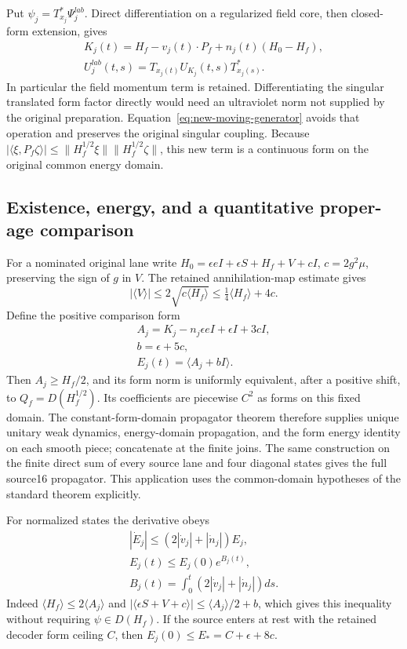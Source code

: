 Put \(\psi_j=T_{x_j}^*\Psi_j^{lab}\). Direct differentiation on a
regularized field core, then closed-form extension, gives
\begin{equation}
\begin{gathered}
K_j(t)=H_f-v_j(t)\cdot P_f+n_j(t)(H_0-H_f),\\
 U_j^{lab}(t,s)=T_{x_j(t)}U_{K_j}(t,s)T_{x_j(s)}^* .
\end{gathered}
\label{eq:new-moving-generator}
\end{equation}
In particular the field momentum term is retained. Differentiating the
singular translated form factor directly would need an ultraviolet norm
not supplied by the original preparation. Equation~\eqref{eq:new-moving-generator}
avoids that operation and preserves the original singular coupling.
Because \(|\langle\xi,P_f\zeta\rangle|\leq
\|H_f^{1/2}\xi\|\|H_f^{1/2}\zeta\|\), this new term is a continuous
form on the original common energy domain.

\subsection{Existence, energy, and a quantitative proper-age comparison}
For a nominated original lane write
\(H_0=\epsilon eI+\epsilon S+H_f+V+cI\),
\(c=2g^2\mu\), preserving the sign of \(g\) in \(V\).
The retained annihilation-map estimate gives
\[
 |\langle V\rangle|\leq2\sqrt{c\langle H_f\rangle}
 \leq\tfrac14\langle H_f\rangle+4c.
\]
Define the positive comparison form
\[\begin{gathered}
A_j=K_j-n_j\epsilon eI+\epsilon I+3cI,
 \\
 b=\epsilon+5c,\\
 E_j(t)=\langle A_j+bI\rangle.
\end{gathered}\]
Then \(A_j\geq H_f/2\), and its form norm is uniformly equivalent,
after a positive shift, to \(Q_f=D(H_f^{1/2})\). Its coefficients are
piecewise \(C^2\) as forms on this fixed domain. The constant-form-domain
propagator theorem therefore supplies unique unitary weak dynamics,
energy-domain propagation, and the form energy identity on each smooth
piece; concatenate at the finite joins. The same construction on the
finite direct sum of every source lane and four diagonal states gives the
full source16 propagator. This application uses the common-domain
hypotheses of the standard theorem explicitly.\cite{ConstantForm}

For normalized states the derivative obeys
\[\begin{gathered}
|\dot E_j|\leq(2|\dot v_j|+|\dot n_j|)E_j,
 \\
 E_j(t)\leq E_j(0)e^{B_j(t)},\\
 B_j(t)=\int_0^t(2|\dot v_j|+|\dot n_j|)ds.
\end{gathered}\]
Indeed \(\langle H_f\rangle\leq2\langle A_j\rangle\) and
\(|\langle\epsilon S+V+c\rangle|\leq
\langle A_j\rangle/2+b\), which gives this inequality without
requiring \(\psi\in D(H_f)\). If the source enters at rest with the
retained decoder form ceiling \(C\), then
\(E_j(0)\leq E_*=C+\epsilon+8c\).

